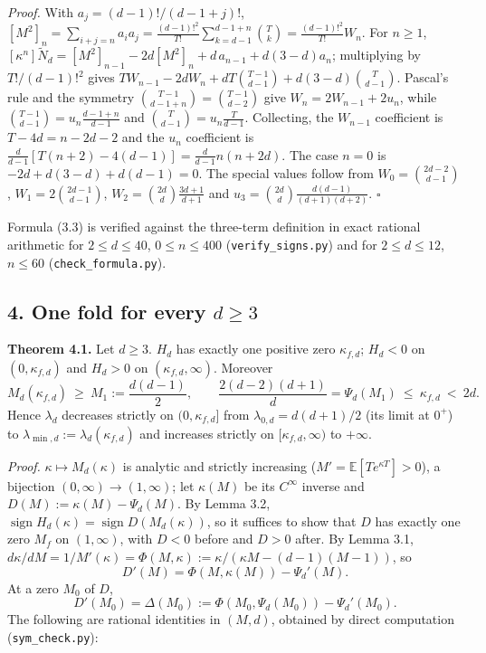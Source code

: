 \documentclass[
  11pt,
  a4paper,
]{article}
\begin{document}
\emph{Proof.} With \(a_j=(d-1)!/(d-1+j)!\),
\([M^2]_n=\sum_{i+j=n}a_ia_j=\frac{(d-1)!^2}{T!}\sum_{k=d-1}^{d-1+n}\binom{T}{k}=\frac{(d-1)!^2}{T!}W_n\).
For \(n\ge1\),
\([\kappa^n]\tilde N_d=[M^2]_{n-1}-2d[M^2]_n+d\,\allowbreak{}a_{n-1}+d(3-d)a_n\);
multiplying by \(T!/(d-1)!^2\) gives
\(TW_{n-1}-2dW_n+dT\binom{T-1}{d-1}+d(3-d)\binom{T}{d-1}\). Pascal's
rule and the symmetry \(\binom{T-1}{d-1+n}=\binom{T-1}{d-2}\) give
\(W_n=2W_{n-1}+2u_n\), while \(\binom{T-1}{d-1}=u_n\frac{d-1+n}{d-1}\)
and \(\binom{T}{d-1}=u_n\frac{T}{d-1}\). Collecting, the \(W_{n-1}\)
coefficient is \(T-4d=n-2d-2\) and the \(u_n\) coefficient is
\(\frac{d}{d-1}[T(n+2)-4(d-1)]=\frac{d}{d-1}n(n+2d)\). The case \(n=0\)
is \(-2d+d(3-d)+d(d-1)=0\). The special values follow from
\(W_0=\binom{2d-2}{d-1}\), \(W_1=2\binom{2d-1}{d-1}\),
\(W_2=\binom{2d}{d}\frac{3d+1}{d+1}\) and
\(u_3=\binom{2d}{d}\frac{d(d-1)}{(d+1)(d+2)}\). \(\square\)

Formula (3.3) is verified against the three-term definition in exact
rational arithmetic for \(2\le d\le40\), \(0\le n\le400\)
({\small\texttt{verify\_\allowbreak{}signs.\allowbreak{}py}}) and for \(2\le d\le12\), \(n\le60\)
({\small\texttt{check\_\allowbreak{}formula.\allowbreak{}py}}).

\subsection{\texorpdfstring{4. One fold for every
\(d\ge3\)}{4. One fold for every d\textbackslash ge3}}\label{one-fold-for-every-dge3}

\textbf{Theorem 4.1.} Let \(d\ge3\). \(H_d\) has exactly one positive
zero \(\kappa_{f,\allowbreak{}d}\); \(H_d<0\) on \((0,\allowbreak{}\kappa_{f,\allowbreak{}d})\) and \(H_d>0\)
on \((\kappa_{f,\allowbreak{}d},\allowbreak{}\infty)\). Moreover
\[M_d(\kappa_{f,d})\ \ge\ M_1:=\frac{d(d-1)}2,\qquad \frac{2(d-2)(d+1)}{d}=\Psi_d(M_1)\ \le\ \kappa_{f,d}\ <\ 2d. \tag{4.1}\]
Hence \(\lambda_d\) decreases strictly on \((0,\allowbreak{}\kappa_{f,\allowbreak{}d}]\) from
\(\lambda_{0,\allowbreak{}d}=d(d+1)/2\) (its limit at \(0^+\)) to
\(\lambda_{\min,\allowbreak{}d}:=\lambda_d(\kappa_{f,\allowbreak{}d})\) and increases strictly on
\([\kappa_{f,\allowbreak{}d},\allowbreak{}\infty)\) to \(+\infty\).

\emph{Proof.} \(\kappa\mapsto M_d(\kappa)\) is analytic and strictly
increasing (\(M'=\mathbb E[Te^{\kappa T}]>0\)), a bijection
\((0,\allowbreak{}\infty)\to(1,\allowbreak{}\infty)\); let \(\kappa(M)\) be its \(C^\infty\)
inverse and \(D(M):=\kappa(M)-\Psi_d(M)\). By Lemma 3.2,
\(\operatorname{sign}H_d(\kappa)=\operatorname{sign}D(M_d(\kappa))\), so
it suffices to show that \(D\) has exactly one zero \(M_f\) on
\((1,\allowbreak{}\infty)\), with \(D<0\) before and \(D>0\) after. By Lemma 3.1,
\(d\kappa/dM=1/M'(\kappa)=\Phi(M,\allowbreak{}\kappa):=\kappa/(\kappa M-(d-1)(M-1))\),
so \[D'(M)=\Phi(M,\kappa(M))-\Psi_d'(M).\] At a zero \(M_0\) of \(D\),
\[D'(M_0)=\Delta(M_0):=\Phi(M_0,\Psi_d(M_0))-\Psi_d'(M_0).\] The
following are rational identities in \((M,\allowbreak{}d)\), obtained by direct
computation ({\small\texttt{sym\_\allowbreak{}check.\allowbreak{}py}}):
\end{document}
